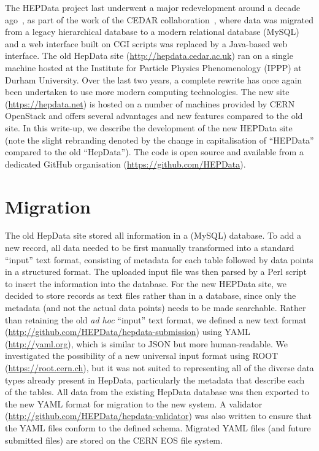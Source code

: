 \documentclass[a4paper]{jpconf}
\begin{document}
The HEPData project last underwent a major redevelopment around a decade
ago~\cite{Buckley:2010jn}, as part of the work of the CEDAR
collaboration~\cite{Buckley:2007hi}, where data was migrated from a legacy
hierarchical database to a modern relational database (MySQL) and a web
interface built on CGI scripts was replaced by a Java-based web interface.  The
old HepData site (\url{http://hepdata.cedar.ac.uk}) ran on a single machine
hosted at the Institute for Particle Physics Phenomenology (IPPP) at Durham
University.  Over the last two years, a complete rewrite has once again been
undertaken to use more modern computing technologies.  The new site
(\url{https://hepdata.net}) is hosted on a number of machines provided by CERN
OpenStack and offers several advantages and new features compared to the old
site.  In this write-up, we describe the development of the new HEPData site
(note the slight rebranding denoted by the change in capitalisation of
``HEPData'' compared to the old ``HepData'').  The code is open source and
available from a dedicated GitHub organisation
(\url{https://github.com/HEPData}).

\section{Migration}

The old HepData site stored all information in a (MySQL) database.  To add a
new record, all data needed to be first manually transformed into a standard
``input'' text format, consisting of metadata for each table followed by data
points in a structured format.  The uploaded input file was then parsed by a
Perl script to insert the information into the database.  For the new HEPData
site, we decided to store records as text files rather than in a database,
since only the metadata (and not the actual data points) needs to be made
searchable.  Rather than retaining the old \emph{ad hoc} ``input'' text format,
we defined a new text format
(\url{http://github.com/HEPData/hepdata-submission}) using YAML
(\url{http://yaml.org}), which is similar to JSON but more human-readable.  We
investigated the possibility of a new universal input format using ROOT
(\url{https://root.cern.ch}), but it was not suited to representing all of the
diverse data types already present in HepData, particularly the metadata that
describe each of the tables.  All data from the existing HepData database was
then exported to the new YAML format for migration to the new system.  A
validator (\url{http://github.com/HEPData/hepdata-validator}) was also written
to ensure that the YAML files conform to the defined schema.  Migrated YAML
files (and future submitted files) are stored on the CERN EOS file system.
\end{document}
